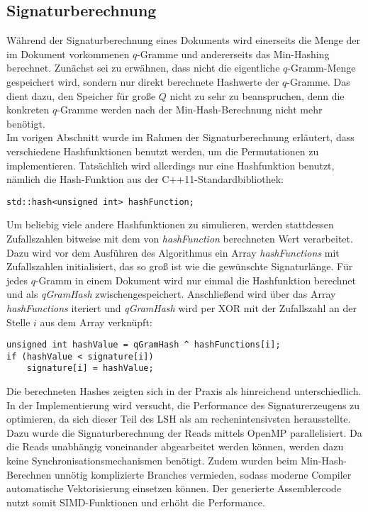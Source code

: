\subsection{Signaturberechnung}
Während der Signaturberechnung eines Dokuments wird einerseits die Menge der im Dokument vorkommenen $q$-Gramme und andererseits das Min-Hashing berechnet.
Zunächst sei zu erwähnen, dass nicht die eigentliche $q$-Gramm-Menge gespeichert wird, sondern nur direkt berechnete Hashwerte der $q$-Gramme.
Das dient dazu, den Speicher für große $Q$ nicht zu sehr zu beanspruchen, denn die konkreten $q$-Gramme werden nach der Min-Hash-Berechnung nicht mehr benötigt.
\\
Im vorigen Abschnitt wurde im Rahmen der Signaturberechnung erläutert, dass verschiedene Hashfunktionen benutzt werden, um die Permutationen zu implementieren.
Tatsächlich wird allerdings nur eine Hashfunktion benutzt, nämlich die Hash-Funktion aus der C++11-Standardbibliothek:
\begin{lstlisting}
std::hash<unsigned int> hashFunction;
\end{lstlisting}
Um beliebig viele andere Hashfunktionen zu simulieren, werden stattdessen Zufallszahlen bitweise mit dem von \textit{hashFunction} berechneten Wert verarbeitet.
Dazu wird vor dem Ausführen des Algorithmus ein Array \textit{hashFunctions} mit Zufallszahlen initialisiert, das so groß ist wie die gewünschte Signaturlänge.
Für jedes $q$-Gramm in einem Dokument wird nur einmal die Hashfunktion berechnet und als \textit{qGramHash} zwischengespeichert.
Anschließend wird über das Array \textit{hashFunctions} iteriert und \textit{qGramHash} wird per XOR mit der Zufallszahl an der Stelle $i$ aus dem Array verknüpft:
\begin{lstlisting}
unsigned int hashValue = qGramHash ^ hashFunctions[i];
if (hashValue < signature[i])
    signature[i] = hashValue;
\end{lstlisting}
Die berechneten Hashes zeigten sich in der Praxis als hinreichend unterschiedlich.
\\
In der Implementierung wird versucht, die Performance des Signaturerzeugens zu optimieren, da sich dieser Teil des LSH als am rechenintensivsten herausstellte.
Dazu wurde die Signaturberechnung der Reads mittels OpenMP parallelisiert.
Da die Reads unabhängig voneinander abgearbeitet werden können, werden dazu keine Synchronisationsmechanismen benötigt.
Zudem wurden beim Min-Hash-Berechnen unnötig komplizierte Branches vermieden, sodass moderne Compiler automatische Vektorisierung einsetzen können.
Der generierte Assemblercode nutzt somit SIMD-Funktionen und erhöht die Performance.
